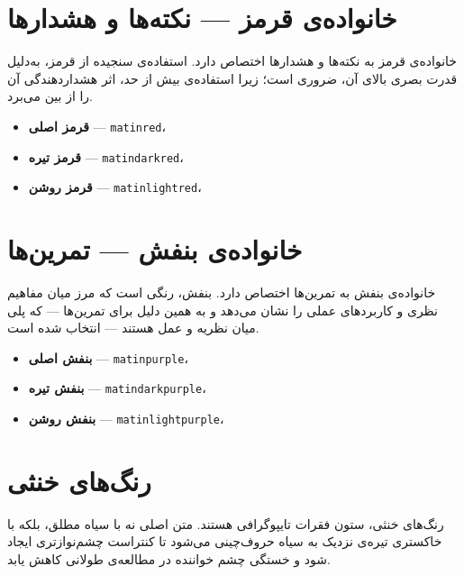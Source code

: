 \documentclass{matinbook}
\begin{document}
\section{خانواده‌ی قرمز — نکته‌ها و هشدارها}
\label{sec:color-red}

خانواده‌ی قرمز به نکته‌ها و هشدارها اختصاص دارد. استفاده‌ی
سنجیده از قرمز، به‌دلیل قدرت بصری بالای آن، ضروری است؛
زیرا استفاده‌ی بیش از حد، اثر هشداردهندگی آن را از بین می‌برد.

\begin{itemize}
    \item \textcolor{matinred}{\textbf{قرمز اصلی}} — \texttt{matinred}،
    \item \textcolor{matindarkred}{\textbf{قرمز تیره}} — \texttt{matindarkred}،
    \item \colorbox{matinlightred}{\textbf{قرمز روشن}} — \texttt{matinlightred}،
\end{itemize}

\section{خانواده‌ی بنفش — تمرین‌ها}
\label{sec:color-purple}

خانواده‌ی بنفش به تمرین‌ها اختصاص دارد. بنفش، رنگی است که
مرز میان مفاهیم نظری و کاربردهای عملی را نشان می‌دهد و
به همین دلیل برای تمرین‌ها — که پلی میان نظریه و عمل هستند —
انتخاب شده است.

\begin{itemize}
    \item \textcolor{matinpurple}{\textbf{بنفش اصلی}} — \texttt{matinpurple}،
    \item \textcolor{matindarkpurple}{\textbf{بنفش تیره}} — \texttt{matindarkpurple}،
    \item \colorbox{matinlightpurple}{\textbf{بنفش روشن}} — \texttt{matinlightpurple}،
\end{itemize}

\section{رنگ‌های خنثی}
\label{sec:color-neutral}

رنگ‌های خنثی، ستون فقرات تایپوگرافی  هستند.
متن اصلی نه با سیاه مطلق، بلکه با خاکستری تیره‌ی نزدیک به سیاه
حروف‌چینی می‌شود تا کنتراست چشم‌نوازتری ایجاد شود و
خستگی چشم خواننده در مطالعه‌ی طولانی کاهش یابد.
\end{document}
